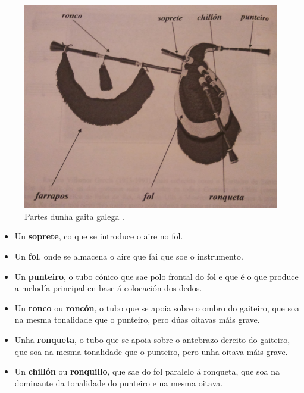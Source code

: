  \begin{figure}[htbp]
  \centering
  \includegraphics[scale=0.1,keepaspectratio=true]{./imagenes/bruno-villamor-partes-gaita-galega.jpg}
  \caption[Partes dunha gaita galega]{Partes dunha gaita galega \cite{BrunoVillamorCaderno15}.}
  \label{figura:BrunoVillamorPartesGaitaGalega}
 \end{figure}

 \begin{itemize}
  \item Un \textbf{soprete}, co que se introduce o aire no fol.
  \item Un \textbf{fol}, onde se almacena o aire que fai que soe o instrumento.
  \item Un \textbf{punteiro}, o tubo cónico que sae polo frontal do fol e que é
        o que produce a melodía principal en base á colocación dos dedos.
  \item Un \textbf{ronco} ou \textbf{roncón}, o tubo que se apoia sobre o ombro
        do gaiteiro, que soa na mesma tonalidade que o punteiro, pero dúas
        oitavas máis grave.
  \item Unha \textbf{ronqueta}, o tubo que se apoia sobre o antebrazo dereito
        do gaiteiro, que soa na mesma tonalidade que o punteiro, pero unha
        oitava máis grave.
  \item Un \textbf{chillón} ou \textbf{ronquillo}, que sae do fol paralelo á
        ronqueta, que soa na dominante da tonalidade do punteiro e na mesma
        oitava.
 \end{itemize}

